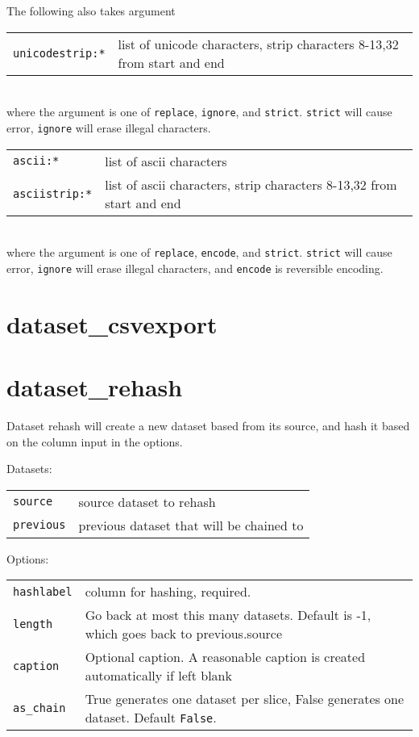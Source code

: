 \noindent The following also takes argument\\

\begin{tabular}{ll}
  \texttt{unicodestrip:*}  & list of unicode characters, strip characters 8-13,32 from start and end\\
\end{tabular}\\

\noindent where the argument is one of \texttt{replace}, \texttt{ignore}, and \texttt{strict}.
\texttt{strict} will cause error, \texttt{ignore} will erase illegal characters.\\

\begin{tabular}{ll}
  \texttt{ascii:*}      & list of ascii characters\\
  \texttt{asciistrip:*} & list of ascii characters, strip characters 8-13,32 from start and end\\
\end{tabular}\\

\noindent where the argument is one of \texttt{replace}, \texttt{encode}, and \texttt{strict}.
\texttt{strict} will cause error, \texttt{ignore} will erase illegal characters,
and \texttt{encode} is reversible encoding.


\clearpage
\section{dataset\_csvexport}

\clearpage
\section{dataset\_rehash}

Dataset rehash will create a new dataset based from its source, and
hash it based on the column input in the options.

\noindent Datasets:

\begin{tabular}{ll}
  \texttt{source}   & source dataset to rehash\\
  \texttt{previous} & previous dataset that will be chained to\\
\end{tabular}

\noindent Options:

\begin{tabular}{ll}
  \texttt{hashlabel} & column for hashing, required.\\
  \texttt{length}    & Go back at most this many datasets. Default is -1, which goes back to previous.source\\
  \texttt{caption}   & Optional caption.  A reasonable caption is created automatically if left blank\\
  \texttt{as\_chain}  & True generates one dataset per slice, False generates one dataset.  Default \texttt{False}.\\
\end{tabular}

